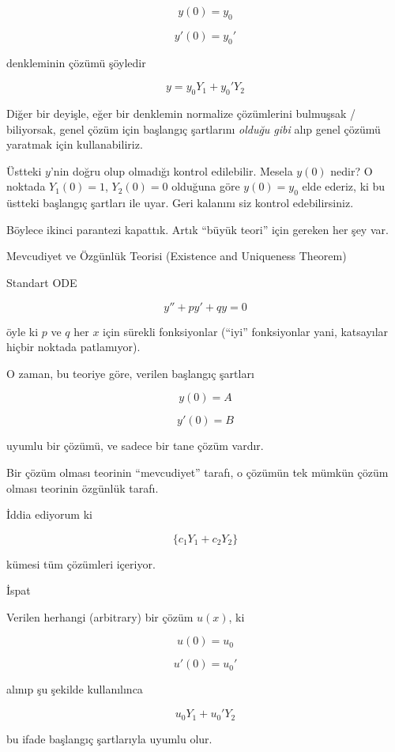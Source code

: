 \documentclass[12pt,fleqn]{article}\usepackage{../../common}
\begin{document}
$$ y(0) = y_0 $$

$$ y'(0) = y_0' $$

denkleminin çözümü şöyledir

$$ y = y_0 Y_1 + y_0' Y_2 $$

Diğer bir deyişle, eğer bir denklemin normalize çözümlerini bulmuşsak /
biliyorsak, genel çözüm için başlangıç şartlarını {\em olduğu gibi} alıp
genel çözümü yaratmak için kullanabiliriz. 

Üstteki $y$'nin doğru olup olmadığı kontrol edilebilir. Mesela $y(0)$
nedir? O noktada $Y_1(0)=1$, $Y_2(0)=0$ olduğuna göre  $y(0)=y_0$ elde
ederiz, ki bu üstteki başlangıç şartları ile uyar. Geri kalanını siz
kontrol edebilirsiniz. 

Böylece ikinci parantezi kapattık. Artık ``büyük teori'' için gereken her
şey var.

Mevcudiyet ve Özgünlük Teorisi (Existence and Uniqueness Theorem)

Standart ODE

$$ y'' + py' + qy = 0 $$

öyle ki $p$ ve $q$ her $x$ için sürekli fonksiyonlar (``iyi'' fonksiyonlar
yani, katsayılar hiçbir noktada patlamıyor). 

O zaman, bu teoriye göre, verilen başlangıç şartları

$$ y(0) = A $$

$$ y'(0) = B $$

uyumlu bir çözümü, ve sadece bir tane çözüm vardır. 

Bir çözüm olması teorinin ``mevcudiyet'' tarafı, o çözümün tek mümkün çözüm
olması teorinin özgünlük tarafı. 

İddia ediyorum ki 

$$ \bigg\{ c_1Y_1 + c_2Y_2 \bigg\} $$

kümesi tüm çözümleri içeriyor. 

İspat

Verilen herhangi (arbitrary) bir çözüm $u(x)$, ki

$$ u(0) = u_0 $$

$$ u'(0) = u_0' $$

alınıp şu şekilde kullanılınca

$$ u_0 Y_1 +  u_0'Y_2 $$

bu ifade başlangıç şartlarıyla uyumlu olur. 
\end{document}
